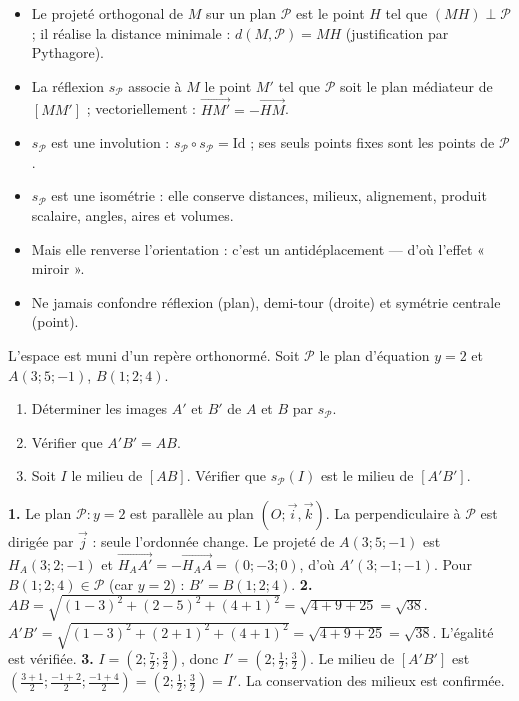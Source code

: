 \documentclass[11pt]{article}
\newcommand{\cle}[1]{{\popxbold\color{popdark}#1}}
\begin{document}
\begin{aretenir}
\begin{itemize}
\item Le \cle{projeté orthogonal} de $M$ sur un plan $\mathcal{P}$ est le point $H$ tel que $(MH) \perp \mathcal{P}$ ; il réalise la distance minimale : $d(M, \mathcal{P}) = MH$ (justification par Pythagore).
\item La \cle{réflexion} $s_{\mathcal{P}}$ associe à $M$ le point $M'$ tel que $\mathcal{P}$ soit le plan médiateur de $[MM']$ ; vectoriellement : $\overrightarrow{HM'} = -\overrightarrow{HM}$.
\item $s_{\mathcal{P}}$ est une \cle{involution} : $s_{\mathcal{P}} \circ s_{\mathcal{P}} = \mathrm{Id}$ ; ses seuls points fixes sont les points de $\mathcal{P}$.
\item $s_{\mathcal{P}}$ est une \cle{isométrie} : elle conserve distances, milieux, alignement, produit scalaire, angles, aires et volumes.
\item Mais elle \cle{renverse l'orientation} : c'est un antidéplacement — d'où l'effet « miroir ».
\item Ne jamais confondre réflexion (plan), demi-tour (droite) et symétrie centrale (point).
\end{itemize}
\end{aretenir}

\begin{exercice}
L'espace est muni d'un repère orthonormé. Soit $\mathcal{P}$ le plan d'équation $y = 2$ et $A(3; 5; -1)$, $B(1; 2; 4)$.
\begin{enumerate}
\item Déterminer les images $A'$ et $B'$ de $A$ et $B$ par $s_{\mathcal{P}}$.
\item Vérifier que $A'B' = AB$.
\item Soit $I$ le milieu de $[AB]$. Vérifier que $s_{\mathcal{P}}(I)$ est le milieu de $[A'B']$.
\end{enumerate}
\end{exercice}

\begin{corrige}[Exercice 1]
\textbf{1.} Le plan $\mathcal{P} : y = 2$ est parallèle au plan $(O;\vec{i},\vec{k})$. La perpendiculaire à $\mathcal{P}$ est dirigée par $\vec{j}$ : seule l'ordonnée change. Le projeté de $A(3;5;-1)$ est $H_A(3;2;-1)$ et $\overrightarrow{H_A A'} = -\overrightarrow{H_A A} = (0;-3;0)$, d'où $A'(3; -1; -1)$. Pour $B(1;2;4) \in \mathcal{P}$ (car $y = 2$) : $B' = B(1;2;4)$.
\textbf{2.} $AB = \sqrt{(1-3)^2 + (2-5)^2 + (4+1)^2} = \sqrt{4 + 9 + 25} = \sqrt{38}$. $A'B' = \sqrt{(1-3)^2 + (2+1)^2 + (4+1)^2} = \sqrt{4+9+25} = \sqrt{38}$. L'égalité est vérifiée.
\textbf{3.} $I = \left(2; \frac{7}{2}; \frac{3}{2}\right)$, donc $I' = \left(2; \frac{1}{2}; \frac{3}{2}\right)$. Le milieu de $[A'B']$ est $\left(\frac{3+1}{2}; \frac{-1+2}{2}; \frac{-1+4}{2}\right) = \left(2; \frac{1}{2}; \frac{3}{2}\right) = I'$. La conservation des milieux est confirmée.
\end{corrige}
\end{document}
